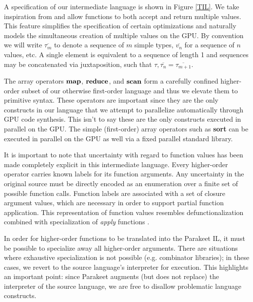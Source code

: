 \documentclass[10pt,twocolumn]{article}
\begin{document}
A specification of our intermediate language is shown in Figure \ref{TIL}. We take inspiration from \cite{Bol09} and allow functions to both accept and return multiple values. This feature simplifies the specification of certain optimizations and naturally models the simultaneous creation of multiple values on the GPU. By convention we will write $\overline{\tau_m}$ to denote a sequence of $m$ simple types, $\overline{v_n}$ for a sequence  of $n$ values, etc. A single element is equivalent to a sequence of length 1 and sequences may be concatenated via juxtaposition, such that $\tau, \overline{\tau_n} = \overline{\tau_{m+1}}$.

The array operators $\mbox{\textbf{map}}$, $\mbox{\textbf{reduce}}$, and $\mbox{\textbf{scan}}$ form a carefully confined higher-order subset of our otherwise first-order language and thus we elevate them to primitive syntax. These operators are important since they are the only constructs in our language that we attempt to parallelize automatically through GPU code synthesis. This isn't to say these are the only constructs executed in parallel on the GPU. The simple (first-order) array operators such as \textbf{sort} can be executed in parallel on the GPU as well via a fixed parallel standard library. 


It is important to note that uncertainty with regard to function values has been made completely explicit in this intermediate language. Every higher-order operator carries known labels for its function arguments. Any uncertainty in the original source must be directly encoded as an enumeration over a finite set of possible function calls. Function labels are associated with a set of closure argument values, which are necessary in order to support partial function application. This representation of function values resembles defunctionalization combined with specialization of \textit{apply} functions \cite{Tolmach98}. 

In order for higher-order functions to be translated into the Parakeet IL, it must be possible to specialize away all higher-order arguments. There are situations where exhaustive specialization is not possible (e.g. combinator libraries); in these cases, we revert to the source language's interpreter for
execution. This highlights an important point: since Parakeet augments (but does not replace) the interpreter of the source language, we are free to disallow problematic language constructs.
\end{document}
